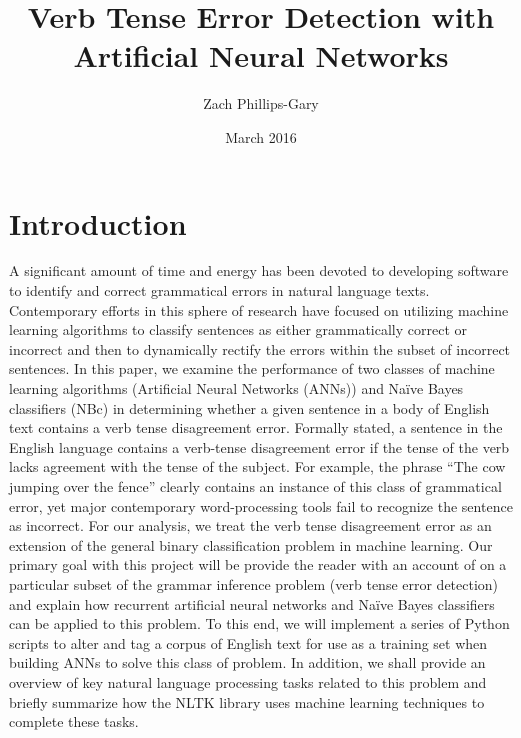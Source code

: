 \documentclass{article}
\title{Verb Tense Error Detection with Artificial Neural Networks}
\author{Zach Phillips-Gary}
\date{March 2016}
\begin{document}
\maketitle

\section{Introduction}
A significant amount of time and energy has been devoted to developing software to identify and correct grammatical errors in natural language texts. Contemporary efforts in this sphere of research have focused on utilizing machine learning algorithms to classify sentences as either grammatically correct or incorrect and then to dynamically rectify the errors within the subset of incorrect sentences.  In this paper, we examine the performance of two classes of machine learning algorithms (Artificial Neural Networks (ANNs)) and Naïve Bayes classifiers (NBc) in determining whether a given sentence in a body of English text contains a verb tense disagreement error. Formally stated, a sentence in the English language contains a verb-tense disagreement error if the tense of the verb lacks agreement with the tense of the subject. For example, the phrase “The cow jumping over the fence” clearly contains an instance of this class of grammatical error, yet major contemporary word-processing tools fail to recognize the sentence as incorrect. For our analysis, we  treat the verb tense disagreement error as an extension of the general binary classification problem in machine learning. Our primary goal with this project will be provide the reader with an account of on a particular subset of the grammar inference problem (verb tense error detection) and explain how recurrent artificial neural networks and Naïve Bayes classifiers can be applied to this problem. To this end, we will implement a series of Python scripts to alter and tag a corpus of English text for use as a training set when building ANNs to solve this class of problem. In addition, we shall provide an overview of key natural language processing tasks related to this problem and briefly summarize how the NLTK library \citep{NLTK} uses machine learning techniques to complete these tasks. 
\end{document}
